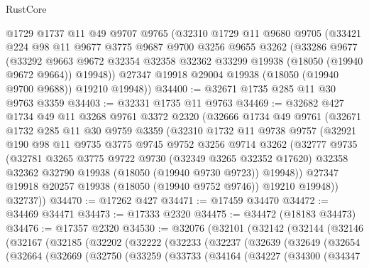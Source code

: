 \begin{lexlean}{RustCore}
\begin{coremodule}
    @1729
    @1737
    @11
    @49
    @9707
    @9765
    (@32310
      @1729
      @11
      @9680
      @9705
      (@33421
        @224
        @98
        @11
        @9677
        @3775
        @9687
        @9700
        @3256
        @9655
        @3262
        (@33286
          @9677
          (@33292
            @9663
            @9672
            @32354
            @32358
            @32362
            @33299
            @19938
            (@18050 (@19940 @9672 @9664))
            @19948))
        @27347
        @19918
        @29004
        @19938
        (@18050 (@19940 @9700 @9688))
        @19210
        @19948))
@34400 := @32671 @1735 @285 @11 @30 @9763 @3359
@34403 := @32331 @1735 @11 @9763
@34469 := @32682
    @427
    @1734
    @49
    @11
    @3268
    @9761
    @3372
    @2320
    (@32666
      @1734
      @49
      @9761
      (@32671
        @1732
        @285
        @11
        @30
        @9759
        @3359
        (@32310
          @1732
          @11
          @9738
          @9757
          (@32921
            @190
            @98
            @11
            @9735
            @3775
            @9745
            @9752
            @3256
            @9714
            @3262
            (@32777
              @9735
              (@32781
                @3265
                @3775
                @9722
                @9730
                (@32349 @3265 @32352 @17620)
                @32358
                @32362
                @32790
                @19938
                (@18050 (@19940 @9730 @9723))
                @19948))
            @27347
            @19918
            @20257
            @19938
            (@18050 (@19940 @9752 @9746))
            @19210
            @19948))
        @32737))
@34470 := @17262 @427
@34471 := @17459 @34470
@34472 := @34469 @34471
@34473 := @17333 @2320
@34475 := @34472 (@18183 @34473)
@34476 := @17357 @2320
@34530 := @32076
    (@32101
      (@32142
        (@32144
          (@32146
            (@32167
              (@32185
                (@32202
                  (@32222
                    (@32233
                      (@32237
                        (@32639
                          (@32649
                            (@32654
                              (@32664
                                (@32669
                                  (@32750
                                    (@33259
                                      (@33733
                                        (@34164
                                          (@34227
                                            (@34300
                                              (@34347

\end{coremodule}
\end{lexlean}
